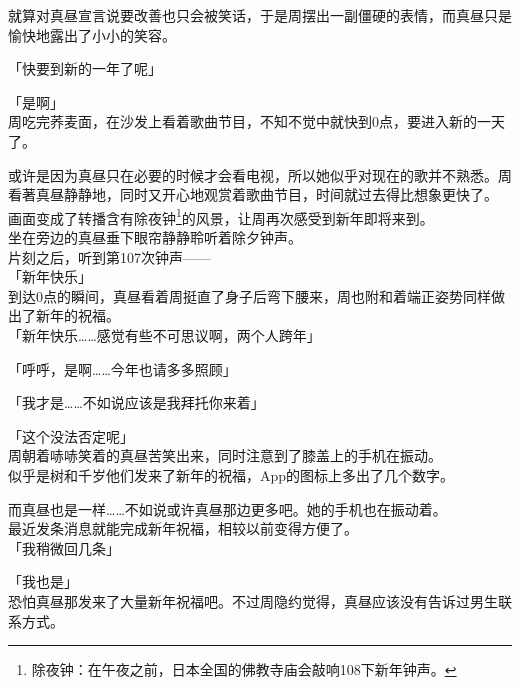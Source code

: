就算对真昼宣言说要改善也只会被笑话，于是周摆出一副僵硬的表情，而真昼只是愉快地露出了小小的笑容。\\%

\vspace{2\baselineskip}

「快要到新的一年了呢」

「是啊」\\

周吃完荞麦面，在沙发上看着歌曲节目，不知不觉中就快到0点，要进入新的一天了。

或许是因为真昼只在必要的时候才会看电视，所以她似乎对现在的歌并不熟悉。周看著真昼静静地，同时又开心地观赏着歌曲节目，时间就过去得比想象更快了。\\

画面变成了转播含有除夜钟\footnote{除夜钟：在午夜之前，日本全国的佛教寺庙会敲响108下新年钟声。}的风景，让周再次感受到新年即将来到。\\

坐在旁边的真昼垂下眼帘静静聆听着除夕钟声。\\

片刻之后，听到第107次钟声——\\

「新年快乐」\\

到达0点的瞬间，真昼看着周挺直了身子后弯下腰来，周也附和着端正姿势同样做出了新年的祝福。\\

「新年快乐……感觉有些不可思议啊，两个人跨年」

「呼呼，是啊……今年也请多多照顾」

「我才是……不如说应该是我拜托你来着」

「这个没法否定呢」\\

周朝着哧哧笑着的真昼苦笑出来，同时注意到了膝盖上的手机在振动。\\

似乎是树和千岁他们发来了新年的祝福，App的图标上多出了几个数字。

而真昼也是一样……不如说或许真昼那边更多吧。她的手机也在振动着。\\

最近发条消息就能完成新年祝福，相较以前变得方便了。\\

「我稍微回几条」

「我也是」\\

恐怕真昼那发来了大量新年祝福吧。不过周隐约觉得，真昼应该没有告诉过男生联系方式。\\

